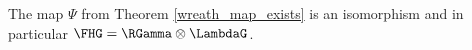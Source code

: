 \begin{theorem} \label{main_thm}
The map $\Psi$ from Theorem \ref{wreath_map_exists} is an isomorphism and in particular $\FHG = \RGamma \otimes \LambdaG$.
\end{theorem}
